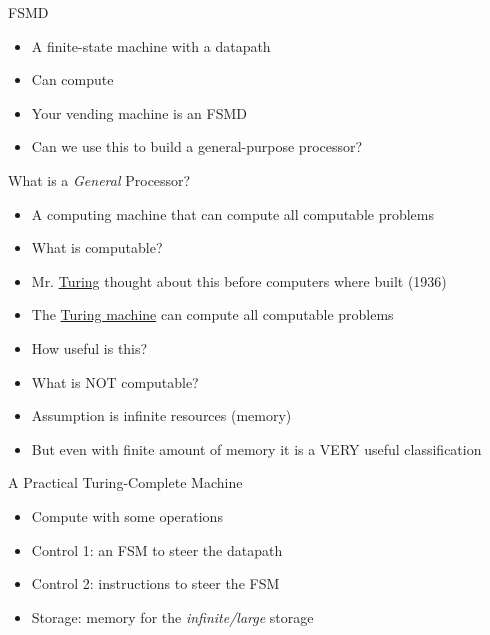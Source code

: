 
\begin{frame}[fragile]{FSMD}
\begin{itemize}
\item A finite-state machine with a datapath
\item Can compute
\item Your vending machine is an FSMD
\item Can we use this to build a general-purpose processor?
\end{itemize}
\end{frame}

\begin{frame}[fragile]{What is a \emph{General} Processor?}
\begin{itemize}
\item A computing machine that can compute all computable problems
\item What is computable?
\item Mr. \href{https://en.wikipedia.org/wiki/Alan_Turing}{Turing} thought about this before computers where built (1936)
\item The \href{https://en.wikipedia.org/wiki/Turing_machine}{Turing machine} can compute all computable problems
\item How useful is this?
\item What is NOT computable?
\item Assumption is infinite resources (memory)
\item But even with finite amount of memory it is a VERY useful classification
\end{itemize}
\end{frame}

\begin{frame}[fragile]{A Practical Turing-Complete Machine}
\begin{itemize}
\item Compute with some operations
\item Control 1: an FSM to steer the datapath
\item Control 2: instructions to steer the FSM
\item Storage: memory for the \emph{infinite/large} storage
\end{itemize}
\end{frame}

